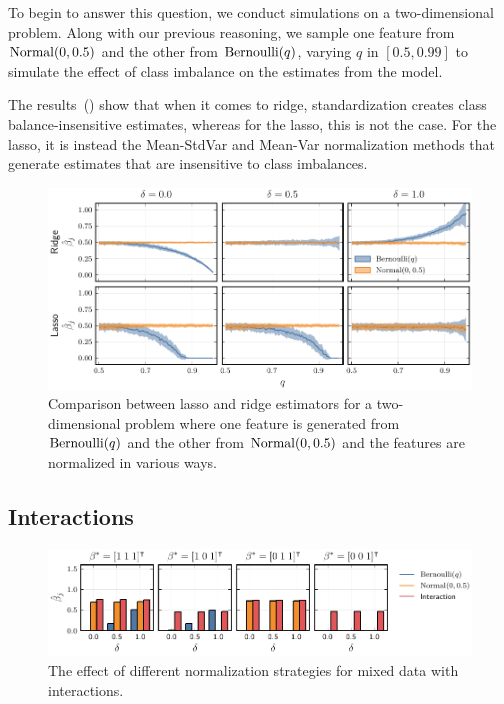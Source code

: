 To begin to answer this question, we conduct simulations on a two-dimensional problem. Along with our previous reasoning, we sample one feature from \(\operatorname{Normal}(0, 0.5)\) and the other from \(\operatorname{Bernoulli}(q)\), varying \(q\) in \([0.5, 0.99]\) to simulate the effect of class imbalance on the estimates from the model.

The results~() show that when it comes to ridge, standardization creates class balance-insensitive estimates, whereas for the lasso, this is not the case. For the lasso, it is instead the Mean-StdVar and Mean-Var normalization methods that generate estimates that are insensitive to class imbalances.

\begin{figure}[htpb]
  \centering
  \includegraphics{plots/mixed_data.pdf}
  \caption{%
    Comparison between lasso and ridge estimators for a two-dimensional problem where one feature is generated from \(\operatorname{Bernoulli}(q)\) and the other from \(\operatorname{Normal}(0, 0.5)\) and the features are normalized in various ways.}
  \label{fig:lasso-ridge-comparison}
\end{figure}

\subsection{Interactions}

\begin{figure}[htpb]
  \centering
  \includegraphics[]{plots/interactions.pdf}
  \caption{%
    The effect of different normalization strategies for mixed data with interactions.
  }
\end{figure}
